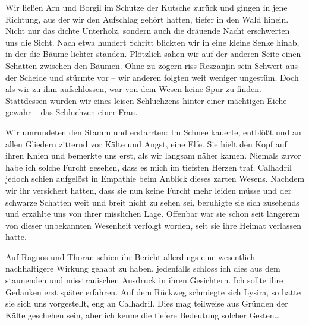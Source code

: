 Wir ließen Arn und Borgil im Schutze der Kutsche zurück und gingen in jene Richtung, aus der wir den Aufschlag gehört hatten, tiefer in den Wald hinein. Nicht nur das dichte Unterholz, sondern auch die dräuende Nacht erschwerten uns die Sicht. Nach etwa hundert Schritt blickten wir in eine kleine Senke hinab, in der die Bäume lichter standen. Plötzlich sahen wir auf der anderen Seite einen Schatten zwischen den Bäumen. Ohne zu zögern riss Rezzanjin sein Schwert aus der Scheide und stürmte vor -- wir anderen folgten weit weniger ungestüm. Doch als wir zu ihm aufschlossen, war von dem Wesen keine Spur zu finden. Stattdessen wurden wir eines leisen Schluchzens hinter einer mächtigen Eiche gewahr -- das Schluchzen einer Frau.\par
  
Wir umrundeten den Stamm und erstarrten: Im Schnee kauerte, entblößt und an allen Gliedern zitternd vor Kälte und Angst, eine Elfe. Sie hielt den Kopf auf ihren Knien und bemerkte uns erst, als wir langsam näher kamen. Niemals zuvor habe ich solche Furcht gesehen, dass es mich im tiefsten Herzen traf. Calhadril jedoch schien aufgelöst in Empathie beim Anblick dieses zarten Wesens. Nachdem wir ihr versichert hatten, dass sie nun keine Furcht mehr leiden müsse und der schwarze Schatten weit und breit nicht zu sehen sei, beruhigte sie sich zusehends und erzählte uns von ihrer misslichen Lage. Offenbar war sie schon seit längerem von dieser unbekannten Wesenheit verfolgt worden, seit sie ihre Heimat verlassen hatte. \par

Auf Ragnos und Thoran schien ihr Bericht allerdings eine wesentlich nachhaltigere Wirkung gehabt zu haben, jedenfalls schloss ich dies aus dem staunenden und misstrauischen Ausdruck in ihren Gesichtern. Ich sollte ihre Gedanken erst später erfahren. Auf dem Rückweg schmiegte sich Lysira, so hatte sie sich uns vorgestellt, eng an Calhadril. Dies mag teilweise aus Gründen der Kälte geschehen sein, aber ich kenne die tiefere Bedeutung solcher Gesten…\par

